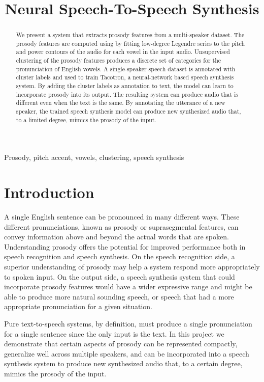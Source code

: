 \documentclass{article}
\title{Neural Speech-To-Speech Synthesis}
\begin{document}
%
\maketitle
%
\begin{abstract}
We present a system that extracts prosody features from a multi-speaker dataset.
The prosody features are computed using by fitting low-degree Legendre series to the pitch and power contours of the audio for each vowel in the input audio.
Unsupervised clustering of the prosody features produces a discrete set of categories for the pronunciation of English vowels. A single-speaker speech dataset is annotated with cluster labels and used to train Tacotron, a neural-network based speech synthesis system.
By adding the cluster labels as annotation to text, the model can learn to incorporate prosody into its output.
The resulting system can produce audio that is different even when the text is the same.
By annotating the utterance of a new speaker, the trained speech synthesis model can produce new synthesized audio that, to a limited degree, mimics the prosody of the input.
\end{abstract}
%
\begin{keywords}
Prosody, pitch accent, vowels, clustering, speech synthesis
\end{keywords}
%
\section{Introduction}
\label{sec:intro}

A single English sentence can be pronounced in many different ways.
These different pronunciations, known as prosody or suprasegmental features, can convey information above and beyond the actual words that are spoken.
Understanding prosody offers the potential for improved performance both in speech recognition and speech synthesis.
On the speech recognition side, a superior understanding of prosody may help a system respond more appropriately to spoken input.
On the output side, a speech synthesis system that could incorporate prosody features would have a wider expressive range and might be able to produce more natural sounding speech, or speech that had a more appropriate pronunciation for a given situation.

Pure text-to-speech systems, by definition, must produce a single pronunciation for a single sentence since the only input is the text.
In this project we demonstrate that certain aspects of prosody can be represented compactly, generalize well across multiple speakers, and can be incorporated into a speech synthesis system to produce new synthesized audio that, to a certain degree, mimics the prosody of the input.
\end{document}
